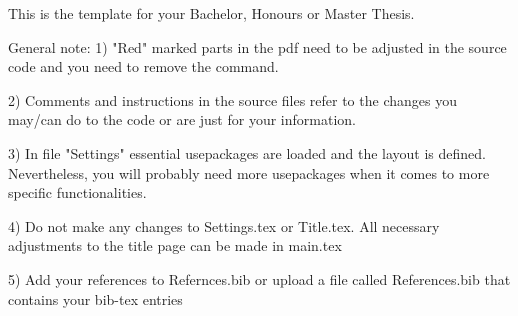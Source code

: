 This is the template for your Bachelor, Honours or Master Thesis. 

General note:
1) "Red" marked parts in the pdf need to be adjusted in the source code and you need to remove the \textcolor{}{} command.

2) Comments and instructions in the source files refer to the changes you may/can do to the code or are just for your information.

3) In file "Settings" essential usepackages are loaded and the layout is defined. Nevertheless, you will probably need more usepackages when it comes to more specific functionalities. 

4) Do not make any changes to Settings.tex or Title.tex. All necessary adjustments to the title page can be made in main.tex

5) Add your references to Refernces.bib or upload a file called References.bib that contains your bib-tex entries
